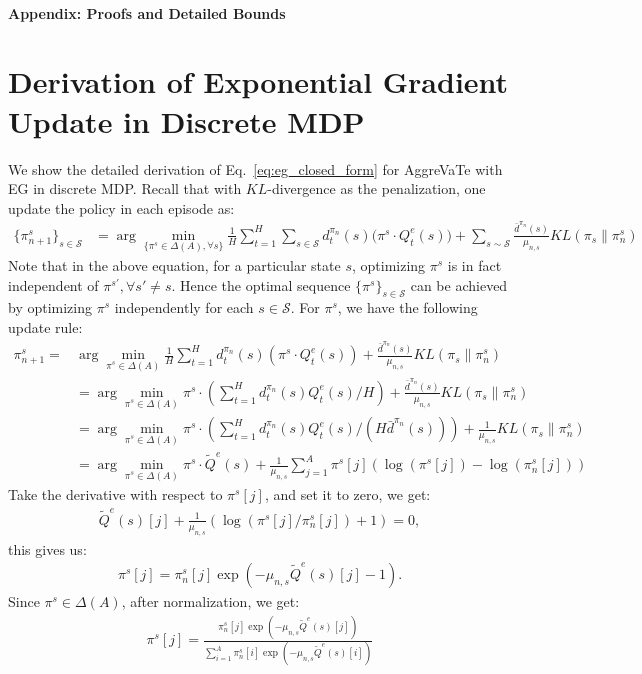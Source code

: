 \documentclass{article}
\begin{document}
{\small


}


\newpage
\onecolumn
\appendix
\paragraph{Appendix: Proofs and Detailed Bounds}

\section{Derivation of Exponential Gradient Update in Discrete MDP}
\label{sec:EG_derivation}
We show the detailed derivation of Eq.~\ref{eq:eg_closed_form} for AggreVaTe with EG in discrete MDP. Recall that with $KL$-divergence as the penalization, one update the policy in each episode as:
\begin{align}
\{\pi_{n+1}^s\}_{s\in\mathcal{S}} &= \arg\min_{\{\pi^s\in \Delta(A),\forall s\}}\frac{1}{H}\sum_{t=1}^H\sum_{s\in\mathcal{S}}d_t^{\pi_n}(s)\big( \pi^s\cdot Q_t^e(s)\big) + \sum_{s\sim\mathcal{S}}\frac{\bar{d}^{\pi_n}(s)}{\mu_{n,s}}KL(\pi_s \| \pi_n^s) \nonumber
\end{align} Note that in the above equation, for a particular state $s$, optimizing $\pi^s$ is in fact independent of $\pi^{s'}, \forall s'\neq s$. Hence the optimal sequence $\{\pi^s\}_{s\in\mathcal{S}}$ can be achieved by optimizing $\pi^s$ independently for each $s\in\mathcal{S}$. For $\pi^s$, we have the following update rule:
\begin{align}
\pi_{n+1}^s = &\arg\min_{\pi^s\in\Delta(A)}\frac{1}{H}\sum_{t=1}^H d_t^{\pi_n}(s)(\pi^s\cdot Q^e_t(s)) + \frac{\bar{d}^{\pi_n}(s)}{\mu_{n,s}}KL(\pi_s\| \pi_n^s) \nonumber\\
& = \arg\min_{\pi^s\in\Delta(A)}\pi^{s}\cdot (\sum_{t=1}^H d_t^{\pi_n}(s)Q_t^e(s) / H) + \frac{\bar{d}^{\pi_n}(s)}{\mu_{n,s}}KL(\pi_s\|\pi_n^s) \nonumber\\
& = \arg\min_{\pi^s\in\Delta(A)}\pi^{s}\cdot (\sum_{t=1}^H d_t^{\pi_n}(s)Q_t^e(s) /(H\bar{d}^{\pi_n}(s))) + \frac{1}{\mu_{n,s}}KL(\pi_s\|\pi_n^s) \nonumber\\
& = \arg\min_{\pi^s\in\Delta(A)}\pi^s\cdot \tilde{Q}^e(s) + \frac{1}{\mu_{n,s}}\sum_{j=1}^A \pi^s[j](\log(\pi^s[j]) - \log(\pi_n^s[j]))
\end{align} Take the derivative with respect to $\pi^s[j]$, and set  it to zero, we get:
\begin{align}
\tilde{Q}^e(s)[j] +\frac{1}{\mu_{n,s}}(\log(\pi^s[j]/\pi_n^s[j]) + 1) = 0,
\end{align} this gives us:
\begin{align}
\pi^s[j] = \pi_n^s[j]\exp(-\mu_{n,s}\tilde{Q}^e(s)[j]-1).
\end{align} Since $\pi^s\in\Delta(A)$, after normalization, we get:
\begin{align}
\pi^s[j] = \frac{\pi_n^s[j]\exp(-\mu_{n,s}\tilde{Q}^e(s)[j])}{\sum_{i=1}^A \pi_n^s[i]\exp(-\mu_{n,s}\tilde{Q}^e(s)[i])}
\end{align}
\end{document}
